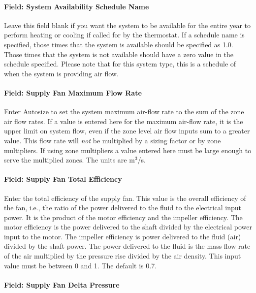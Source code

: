 \paragraph{Field: System Availability Schedule Name}\label{field-system-availability-schedule-name-12}

Leave this field blank if you want the system to be available for the entire year to perform heating or cooling if called for by the thermostat. If a schedule name is specified, those times that the system is available should be specified as 1.0. Those times that the system is not available should have a zero value in the schedule specified. Please note that for this system type, this is a schedule of when the system is providing air flow.

\paragraph{Field: Supply Fan Maximum Flow Rate}\label{field-supply-fan-maximum-flow-rate-3}

Enter Autosize to set the system maximum air-flow rate to the sum of the zone air flow rates. If a value is entered here for the maximum air-flow rate, it is the upper limit on system flow, even if the zone level air flow inputs sum to a greater value. This flow rate will \emph{not} be multiplied by a sizing factor or by zone multipliers. If using zone multipliers a value entered here must be large enough to serve the multiplied zones. The units are m\(^{3}\)/s.

\paragraph{Field: Supply Fan Total Efficiency}\label{field-supply-fan-total-efficiency-10}

Enter the total efficiency of the supply fan. This value is the overall efficiency of the fan, i.e., the ratio of the power delivered to the fluid to the electrical input power. It is the product of the motor efficiency and the impeller efficiency. The motor efficiency is the power delivered to the shaft divided by the electrical power input to the motor. The impeller efficiency is power delivered to the fluid (air) divided by the shaft power. The power delivered to the fluid is the mass flow rate of the air multiplied by the pressure rise divided by the air density. This input value must be between 0 and 1. The default is 0.7.

\paragraph{Field: Supply Fan Delta Pressure}\label{field-supply-fan-delta-pressure-9}

